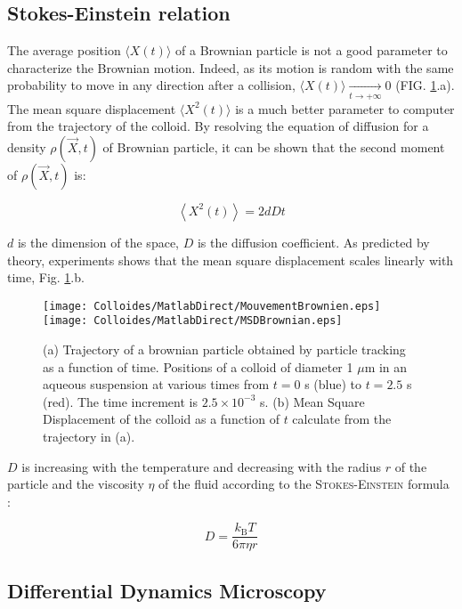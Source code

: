 \documentclass[%
 aip,
 jmp,%
 amsmath,amssymb,
reprint,%
]{revtex4-1}
\begin{document}
\subsection{Stokes-Einstein relation}

The average position $\langle X(t) \rangle$ of a Brownian particle is not a good parameter to characterize the Brownian motion. Indeed, as its motion is random with the same probability to move in any direction after a collision, $\langle X(t) \rangle \underset{t\to +\infty}{\longrightarrow} 0$ (FIG. \ref{BrownianTrajectory}.a). The mean square displacement \citep{11_ken2003molecular} $\langle X^2(t) \rangle$ is a much better parameter to computer from the trajectory of the colloid. By resolving the equation of diffusion for a density $\rho(\vec{X}, t)$ of Brownian particle, it can be shown that the second moment of $\rho(\vec{X}, t)$ is:

\begin{equation}
\left\langle X^2(t) \right\rangle = 2dDt
\end{equation}

$d$ is the dimension of the space, $D$ is the diffusion coefficient. As predicted by theory, experiments shows that the mean square displacement scales linearly with time, Fig. \ref{BrownianTrajectory}.b.

\begin{figure}
	\texttt{[image: Colloides/MatlabDirect/MouvementBrownien.eps]}\\
	\texttt{[image: Colloides/MatlabDirect/MSDBrownian.eps]}
	\caption{(a) Trajectory of a brownian particle obtained by particle tracking as a function of time. Positions of a colloid of diameter 1 $\mu$m in an aqueous suspension at various times from $t=0$ s (blue) to $t=2.5$ s (red). The time increment is $2.5 \times 10^{-3}$ s. (b) Mean Square Displacement of the colloid as a function of $t$ calculate from the trajectory in (a). }
	\label{BrownianTrajectory}
\end{figure}

$D$ is increasing with the temperature and decreasing with the radius $r$ of the particle and the viscosity $\eta$ of the fluid according to the \textsc{Stokes-Einstein} formula \citep{9_einstein1906theory}:

\begin{equation}
D = \frac{k_\text{B} T}{6 \pi \eta r}
\end{equation}


\subsection{Differential Dynamics Microscopy}
\end{document}
